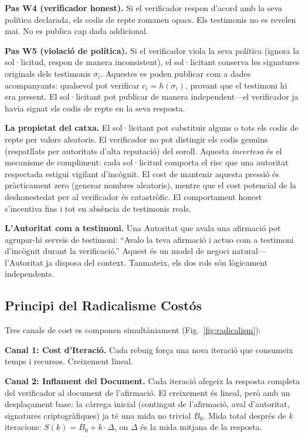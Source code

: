 \documentclass[11pt,a4paper,twocolumn]{article}
\begin{document}
\textbf{Pas W4 (verificador honest).} Si el verificador respon d'acord amb la seva política declarada, els codis de repte romanen opacs. Els testimonis no es revelen mai. No es publica cap dada addicional.

\textbf{Pas W5 (violació de política).} Si el verificador viola la seva política (ignora la sol·licitud, respon de manera inconsistent), el sol·licitant conserva les signatures originals dels testimonis $\sigma_i$. Aquestes es poden publicar com a dades acompanyants: qualsevol pot verificar $c_i = h(\sigma_i)$, provant que el testimoni hi era present. El sol·licitant pot publicar de manera independent---el verificador ja havia signat els codis de repte en la seva resposta.

\textbf{La propietat del catxa.} El sol·licitant pot substituir alguns o tots els codis de repte per valors aleatoris. El verificador no pot distingir els codis genuïns (respatllats per autoritats d'alta reputació) del soroll. Aquesta \emph{incertesa} és el mecanisme de compliment: cada sol·licitud comporta el risc que una autoritat respectada estigui vigilant d'incògnit. El cost de mantenir aquesta pressió és pràcticament zero (generar nombres aleatoris), mentre que el cost potencial de la deshonestedat per al verificador és catastròfic. El comportament honest s'incentiva fins i tot en absència de testimonis reals.

\textbf{L'Autoritat com a testimoni.} Una Autoritat que avala una afirmació pot agrupar-hi serveis de testimoni: ``Avalo la teva afirmació i actuo com a testimoni d'incògnit durant la verificació.'' Aquest és un model de negoci natural---l'Autoritat ja disposa del context. Tanmateix, els dos rols són lògicament independents.

\subsection{Principi del Radicalisme Costós}

Tres canals de cost es componen simultàniament (Fig.~\ref{fig:radicalism}):

\textbf{Canal 1: Cost d'Iteració.} Cada rebuig força una nova iteració que consumeix temps i recursos. Creixement lineal.

\textbf{Canal 2: Inflament del Document.} Cada iteració afegeix la resposta completa del verificador al document de l'afirmació. El creixement és lineal, però amb un desplaçament base: la càrrega inicial (contingut de l'afirmació, aval d'autoritat, signatures criptogràfiques) ja té una mida no trivial $B_0$. Mida total després de $k$ iteracions: $S(k) = B_0 + k \cdot \Delta$, on $\Delta$ és la mida mitjana de la resposta.
\end{document}
